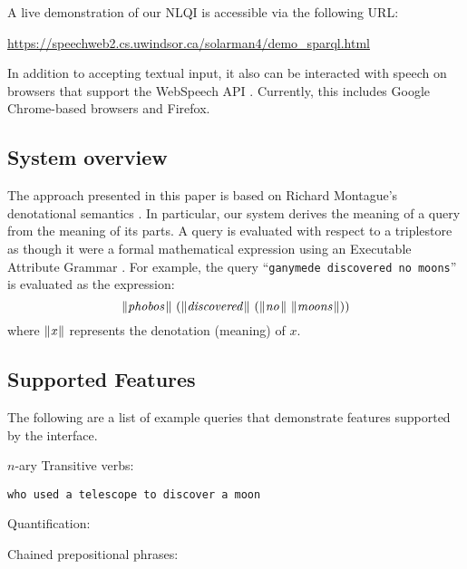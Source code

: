 \documentclass[../main.tex]{subfiles}
\begin{document}
\begin{refsection}
\noindent A live demonstration of our NLQI is accessible via the following URL:
\begin{center}
	\url{https://speechweb2.cs.uwindsor.ca/solarman4/demo_sparql.html}
\end{center}
In addition to accepting textual input, it also can be interacted with speech on browsers that support the WebSpeech API \cite{world2018web}.  Currently, this includes Google Chrome-based browsers and Firefox.

\subsection{System overview}

The approach presented in this paper is based on Richard Montague's denotational semantics \cite{Dowty:wall}.  In particular, our system derives the meaning of a query from the meaning of its parts.  A query is evaluated with respect to a triplestore as though it were a formal mathematical expression using an Executable Attribute Grammar \cite{hafiz2011executable}.  For example, the query
``\texttt{ganymede discovered no moons}'' is evaluated as the expression:
\begin{equation*}
    \meaningof{phobos}\ (\meaningof{discovered}\ (\meaningof{no}\ \meaningof{moons}))
\end{equation*}
where $\lVert\textit{x\hspace{0.1em}}\rVert$ represents the denotation (meaning) of $x$.

\subsection{Supported Features}

The following are a list of example queries that demonstrate features supported by the interface.

\examplespacing

\noindent $n$-ary Transitive verbs:

\examplespacing

\texttt{who used a telescope to discover a moon}

\examplespacing

\noindent Quantification:

\examplespacing


\examplespacing

\noindent Chained prepositional phrases:


\end{refsection}
\end{document}
